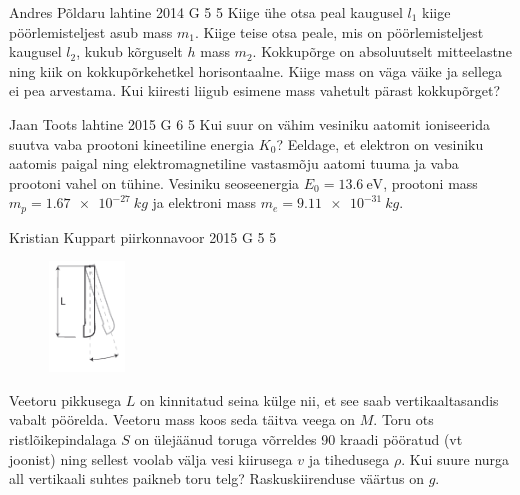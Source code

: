 \documentclass[11pt]{article}
\begin{document}
{%
{Andres Põldaru} %
{lahtine} %
{2014} %
{G 5} %
{5} %
{
\ifStatement
Kiige ühe otsa peal kaugusel $l_1$ kiige pöörlemisteljest asub mass $m_1$. Kiige teise otsa peale, mis on pöörlemisteljest kaugusel $l_2$, kukub kõrguselt $h$ mass $m_2$. Kokkupõrge on absoluutselt mitteelastne ning kiik on kokkupõrkehetkel horisontaalne. Kiige mass on väga väike ja sellega ei pea arvestama. Kui kiiresti liigub esimene mass vahetult pärast kokkupõrget?
\fi
}

{Jaan Toots} %
{lahtine} %
{2015} %
{G 6} %
{5} %
{
\ifStatement
Kui suur on vähim vesiniku aatomit ioniseerida suutva vaba prootoni kineetiline energia $K_0$? Eeldage, et elektron on vesiniku aatomis paigal ning elektromagnetiline vastasmõju aatomi tuuma ja vaba prootoni vahel on tühine. Vesiniku seoseenergia $E_0 = \SI{13.6}{\electronvolt}$, prootoni mass $m_p=\SI{1.67e-27}{kg}$ ja elektroni mass $m_e=\SI{9.11e-31}{kg}$.
\fi
}

{Kristian Kuppart} %
{piirkonnavoor} %
{2015} %
{G 5} %
{5} %
{
\ifStatement
\begin{figure}
 \vspace{-30pt}
 \begin{center}
 \includegraphics[width=0.18\textwidth]{2015-v2g-05-toru}
 \end{center}
\end{figure}
Veetoru pikkusega $L$ on kinnitatud seina külge nii, et see saab vertikaaltasandis vabalt pöörelda. Veetoru mass koos seda täitva veega on $M$. Toru ots ristlõikepindalaga $S$ on ülejäänud toruga võrreldes \num{90} kraadi pööratud (vt joonist) ning sellest voolab välja vesi kiirusega $v$ ja tihedusega $\rho$. Kui suure nurga all vertikaali suhtes paikneb toru telg? Raskuskiirenduse väärtus on $g$.
\pagebreak
\fi
}

}
\end{document}
